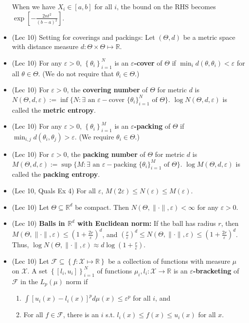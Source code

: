 \documentclass[twoside]{article}
\newcommand{\dis}{\displaystyle}
\newcommand\bbR{\mathbb{R}}
\newcommand\calF{\mathcal{F}}
\def\eps{\varepsilon}
\def\t{\theta}
\newcommand\T{\Theta}
\begin{document}
\begin{itemize}
When we have $X_i \in [a,b]$ for all $i$, the bound on the RHS becomes $\exp \left[ -\dis\frac{2nt^2}{(b-a)^2} \right]$.

\item (Lec 10) Setting for coverings and packings: Let $(\T, d)$ be a metric space with distance measure $d: \T \times \T \mapsto \bbR$.

\item (Lec 10) For any $\eps > 0$, $\left\{\t_{i}\right\}_{i=1}^N$ is an \textbf{$\eps$-cover} of $\T$ if $\min_i d(\theta,\theta_{i})< \eps$ for all $\theta \in \Theta$. (We do not require that $\t_i \in \T$.)

\item (Lec 10) For $\eps > 0$, the \textbf{covering number} of $\T$ for metric $d$ is $N(\T, d, \eps) := \inf \{ N: \exists \text{ an } \eps-\text{cover } \{\t_i \}_{i=1}^N \text{ of } \T \}$. $\log N(\T, d, \eps)$ is called the \textbf{metric entropy}.

\item (Lec 10) For any $\eps > 0$, $\left\{\t_{i}\right\}_{i=1}^M$ is an \textbf{$\eps$-packing} of $\T$ if $\dis\min_{i,j} d(\t_i, \t_j) > \eps$. (We require $\t_i \in \T$.)

\item (Lec 10) For $\eps > 0$, the \textbf{packing number} of $\T$ for metric $d$ is $M(\T, d, \eps) := \sup \{ M: \exists \text{ an } \eps-\text{packing } \{\t_i \}_{i=1}^M \text{ of } \T \}$. $\log M(\T, d, \eps)$ is called the \textbf{packing entropy}.

\item (Lec 10, Quals Ex 4) For all $\eps$, $M(2\eps) \leq N(\eps) \leq M(\eps)$.

\item (Lec 10) Let $\T \subseteq \bbR^d$ be compact. Then $N(\T, \|\cdot\|, \eps) < \infty$ for any $\eps > 0$.

\item (Lec 10) \textbf{Balls in $\bbR^d$ with Euclidean norm:} If the ball has radius $r$, then $M(\T, \| \cdot \|, \eps) \leq \left( 1 + \dis\frac{2r}{\eps}\right)^d$, and $\left( \dis\frac{r}{\eps}\right)^d \leq N(\T, \| \cdot \|, \eps) \leq \left( 1 + \dis\frac{2r}{\eps}\right)^d$. Thus, $\log N(\T, \| \cdot \|, \eps) \approx d \log \left( 1 + \dis\frac{r}{\eps}\right)$.

\item (Lec 10) Let $\calF \subseteq \left\{ f:\mathcal{X} \mapsto \bbR \right\}$ be a collection of functions with measure $\mu$ on $\mathcal{X}$. A set $\left\{[l_i,u_i]\right\}_{i=1}^N$ of functions $\mu_{i},l_{i}:\mathcal{X}\rightarrow\mathbb{R}$ is
an \textbf{$\eps$-bracketing} of $\calF$ in the $L_p(\mu)$ norm if
\begin{enumerate}
\item $\dis\int \left[u_i(x) - l_i(x)\right]^p d\mu(x) \leq \eps^p$ for all $i$, and
\item For all $f \in \calF$, there is an $i$ s.t. $l_i(x) \leq f(x) \leq u_i(x)$ for all $x$.
\end{enumerate}


\end{itemize}
\end{document}

